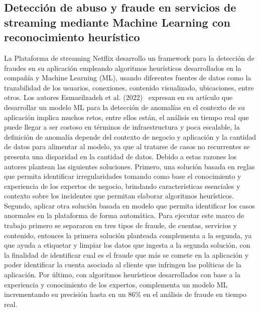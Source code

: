 \documentclass[9pt,a4paper,twoside]{rho-class/rho}
\begin{document}
        \subsection{Detección de abuso y fraude en servicios de streaming mediante Machine Learning con reconocimiento heurístico}
        La Plataforma de streaming Netflix desarrollo un framework para la detección de fraudes en su aplicación empleando algoritmos heurísticos desarrollados en la compañía y Machine Learning (ML), usando diferentes fuentes de datos como la trazabilidad de los usuarios, conexiones, contenido visualizado, ubicaciones, entre otros. Los autores Esmaeilzadeh et al. (2022)~\cite{Esmaeilzadeh2022} expresan en su artículo que desarrollar un modelo ML para la detección de anomalías en el contexto de su aplicación implica muchos retos, entre ellos están, el análisis en tiempo real que puede llegar a ser costoso en términos de infraestructura y poca escalable, la definición de anomalía depende del contexto de negocio y aplicación y la cantidad de datos para alimentar al modelo, ya que al tratarse de casos no recurrentes se presenta una disparidad en la cantidad de datos. Debido a estas razones los autores plantean las siguientes soluciones. Primero, una solución basada en reglas que permita identificar irregularidades tomando como base el conocimiento y experiencia de los expertos de negocio, brindando características esenciales y contexto sobre los incidentes que permitan elaborar algoritmos heurísticos. Segundo, aplicar otra solución basada en modelo que permita identificar los casos anormales en la plataforma de forma automática. Para ejecutar este marco de trabajo primero se separaron en tres tipos de fraude, de cuentas, servicios y contenido, entonces la primera solución planteada complementa a la segunda, ya que ayuda a etiquetar y limpiar los datos que ingesta a la segunda solución, con la finalidad de identificar cual es el fraude que más se comete en la aplicación y poder identificar la cuenta asociada al cliente que infringen las políticas de la aplicación. Por último, con algoritmos heurísticos desarrollados con base a la experiencia y conocimiento de los expertos, complementa un modelo ML incrementando su precisión hasta en un 86\% en el análisis de fraude en tiempo real.
\end{document}
